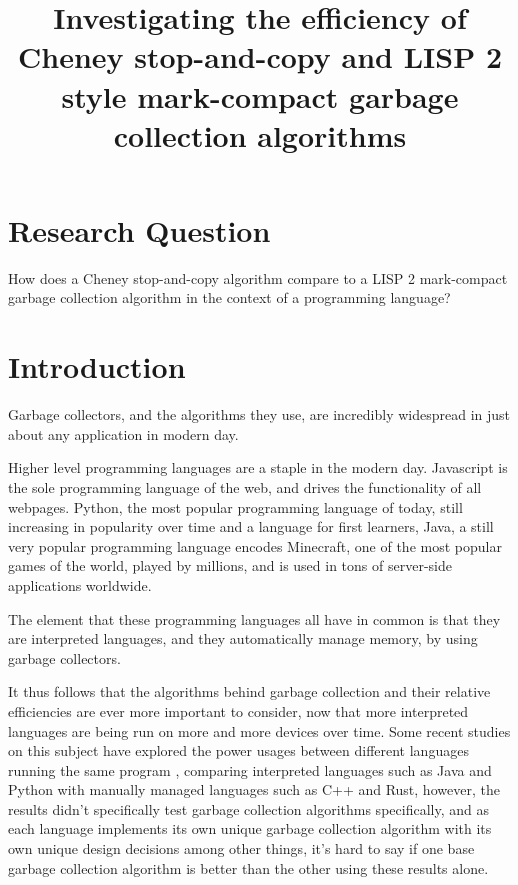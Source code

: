 \documentclass[index]{subfiles}
\begin{document}
\title{Investigating the efficiency of Cheney stop-and-copy and LISP 2 style mark-compact garbage collection algorithms}
\date{}
\author{}
\maketitle

\section{Research Question}

How does a Cheney stop-and-copy algorithm compare to a LISP 2 mark-compact garbage collection algorithm in the context of a programming language? \cite{build_your_own_openjdk_gc}

\section{Introduction}

Garbage collectors, and the algorithms they use, are incredibly widespread in just about any application in modern day.

Higher level programming languages are a staple in the modern day. Javascript is the sole programming language of the web, and drives the functionality of all webpages. Python, the most popular programming language of today, still increasing in popularity over time and a language for first learners, Java, a still very popular programming language encodes Minecraft, one of the most popular games of the world, played by millions, and is used in tons of server-side applications worldwide.

The element that these programming languages all have in common is that they are interpreted languages, and they automatically manage memory, by using garbage collectors.

It thus follows that the algorithms behind garbage collection and their relative efficiencies are ever more important to consider, now that more interpreted languages are being run on more and more devices over time. Some recent studies on this subject have explored the power usages between different languages running the same program \cite{programming_languages_electricity}, comparing interpreted languages such as Java and Python with manually managed languages such as C++ and Rust, however, the results didn't specifically test garbage collection algorithms specifically, and as each language implements its own unique garbage collection algorithm with its own unique design decisions among other things, it's hard to say if one base garbage collection algorithm is better than the other using these results alone.
\end{document}
